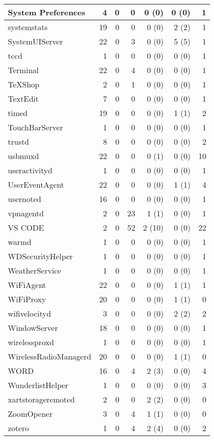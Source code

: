 \begin{adjustwidth}{-2in}{}
\begin{scriptsize}
\begin{longtable}[l]{ l | r | r | r | r | r | r }
    System Preferences &  4 &  0 &  0 &  0 (0) &  0 (0) &  1 \\ \hline
    systemstats & 19 &  0 &  0 &  0 (0) &  2 (2) &  1 \\ \hline
    SystemUIServer &  22 &  0 &  3 &  0 (0) &  5 (5) &  1 \\ \hline
    tccd & 1 &  0 &  0 &  0 (0) &  0 (0) &  1 \\ \hline
    Terminal &  22 &  0 &  4 &  0 (0) &  0 (0) &  1 \\ \hline
    TeXShop &  2 &  0 &  1 &  0 (0) &  0 (0) &  1 \\ \hline
    TextEdit & 7 &  0 &  0 &  0 (0) &  0 (0) &  1 \\ \hline
    timed & 19 &  0 &  0 &  0 (0) &  1 (1) &  2 \\ \hline
    TouchBarServer & 1 &  0 &  0 &  0 (0) &  0 (0) &  1 \\ \hline
    trustd & 8 &  0 &  0 &  0 (0) &  0 (0) &  2 \\ \hline
    usbmuxd & 22 &  0 &  0 &  0 (1) &  0 (0) & 10 \\ \hline
    useractivityd &  1 &  0 &  0 &  0 (0) &  0 (0) &  1 \\ \hline
    UserEventAgent &  22 &  0 &  0 &  0 (0) &  1 (1) &  4 \\ \hline
    usernoted & 16 &  0 &  0 &  0 (0) &  0 (0) &  1 \\ \hline
    vpnagentd &  2 &  0 & 23 &  1 (1) &  0 (0) &  1 \\ \hline
    VS CODE & 2 &  0 & 52 & 2 (10) &  0 (0) & 22 \\ \hline
    warmd &  1 &  0 &  0 &  0 (0) &  0 (0) &  1 \\ \hline
    WDSecurityHelper & 1 &  0 &  0 &  0 (0) &  0 (0) &  1 \\ \hline
    WeatherService & 1 &  0 &  0 &  0 (0) &  0 (0) &  1 \\ \hline
    WiFiAgent & 22 &  0 &  0 &  0 (0) &  1 (1) &  1 \\ \hline
    WiFiProxy & 20 &  0 &  0 &  0 (0) &  1 (1) &  0 \\ \hline
    wifivelocityd &  3 &  0 &  0 &  0 (0) &  2 (2) &  2 \\ \hline
    WindowServer &  18 &  0 &  0 &  0 (0) &  0 (0) &  1 \\ \hline
    wirelessproxd &  1 &  0 &  0 &  0 (0) &  0 (0) &  1 \\ \hline
    WirelessRadioManagerd & 20 &  0 &  0 &  0 (0) &  1 (1) &  0 \\ \hline
    WORD &  16 &  0 &  4 &  2 (3) &  0 (0) &  4 \\ \hline
    WunderlistHelper & 1 &  0 &  0 &  0 (0) &  0 (0) &  3 \\ \hline
    xartstorageremoted & 2 &  0 &  0 &  2 (2) &  0 (0) &  0 \\ \hline
    ZoomOpener & 3 &  0 &  4 &  1 (1) &  0 (0) &  0 \\ \hline
    zotero & 1 &  0 &  4 &  2 (4) &  0 (0) &  2 \\ \hline


\end{longtable}
\end{scriptsize}
\end{adjustwidth}
